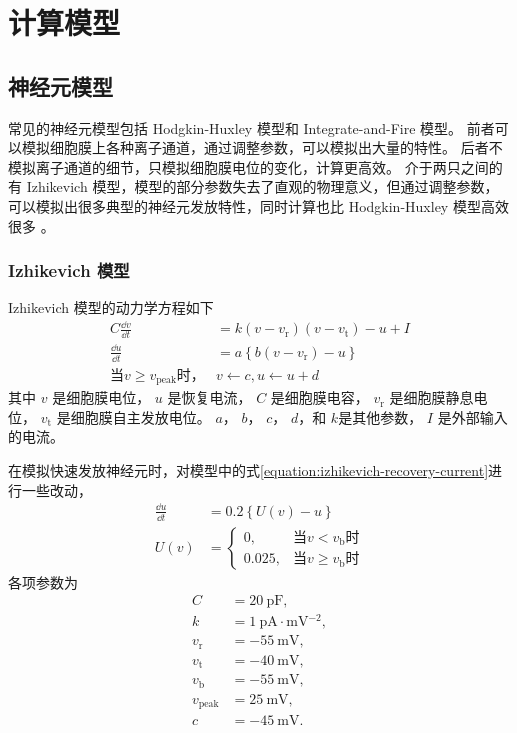 \chapter{计算模型}
\label{chapter:model}

\section{神经元模型}
\label{section:model:neuron-model}

常见的神经元模型包括 Hodgkin-Huxley 模型和 Integrate-and-Fire 模型。
前者可以模拟细胞膜上各种离子通道，通过调整参数，可以模拟出大量的特性。
后者不模拟离子通道的细节，只模拟细胞膜电位的变化，计算更高效。
介于两只之间的有 Izhikevich 模型，模型的部分参数失去了直观的物理意义，但通过调整参数，可以模拟出很多典型的神经元发放特性，同时计算也比 Hodgkin-Huxley 模型高效很多 \cite{Izhikevich2003,Izhikevich2004}。

\subsection{Izhikevich 模型}
Izhikevich 模型的动力学方程如下
\begin{align}
C \frac{\dd{v}}{\dd{t}} &= k \left( v-v_\text{r} \right) \left( v-v_\text{t} \right) - u + I \label{equation:izhikevich-membrane} \\
\frac{\dd{u}}{\dd{t}} &= a \left\{ b \left( v-v_\text{r} \right) - u \right\} \label{equation:izhikevich-recovery-current} \\
\text{当} v \geq v_{\text{peak}} \text{时，} & v \leftarrow c, u \leftarrow u + d \label{equation:izhikevich-spike}
\end{align}
其中 $v$ 是细胞膜电位， $u$ 是恢复电流， $C$ 是细胞膜电容， $v_\text{r}$ 是细胞膜静息电位， $v_\text{t}$ 是细胞膜自主发放电位。
$a$， $b$， $c$， $d$，和 $k$是其他参数， $I$ 是外部输入的电流。

在模拟快速发放神经元时，对模型中的式\ref{equation:izhikevich-recovery-current}进行一些改动，
\begin{align}
\frac{\dd{u}}{\dd{t}} &= 0.2 \left\{ U\left( v \right) - u \right\} \label{equation:izhikevich-fast-spiking} \\
U\left( v \right) &= \begin{cases} 0, &\mbox{当} v < v_\text{b} \mbox{时} \\ 0.025, &\mbox{当} v \geq v_\text{b} \mbox{时} \end{cases}
\end{align}
各项参数为
\begin{align*}
C &= 20\ \text{pF}, \\
k &= 1\ \text{pA} \cdot \text{mV$^{-2}$}, \\
v_\text{r} &= -55\ \text{mV}, \\
v_\text{t} &= -40\ \text{mV}, \\
v_\text{b} &= -55\ \text{mV}, \\
v_\text{peak} &= 25\ \text{mV}, \\
c &= -45\ \text{mV}.
\end{align*}

